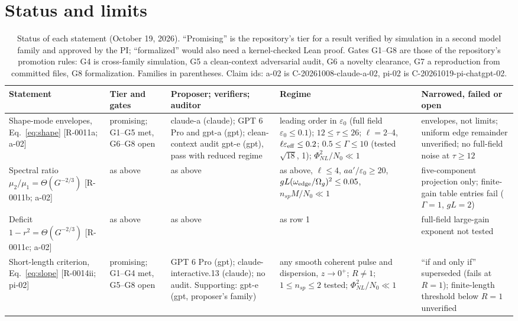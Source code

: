 \documentclass[aps,pra,twocolumn,superscriptaddress,nofootinbib,floatfix]{revtex4-2}
\newcommand{\PNL}{\Phi_{NL}}
\newcommand{\nsp}{n_{sp}}
\newcommand{\eps}{\varepsilon_0}
\begin{document}
\section{Status and limits}\label{sec:status}

\begin{table}[t]
\caption{Status of each statement (October 19, 2026). ``Promising'' is the repository's tier for a result verified by
simulation in a second model family and approved by the PI; ``formalized'' would also need a kernel-checked Lean proof.
Gates G1--G8 are those of the repository's promotion rules: G4 is cross-family simulation, G5 a clean-context adversarial
audit, G6 a novelty clearance, G7 a reproduction from committed files, G8 formalization. Families in parentheses. Claim
ids: a-02 is C-20261008-claude-a-02, pi-02 is C-20261019-pi-chatgpt-02.}
\label{tab:status}
\begin{ruledtabular}\footnotesize
\begin{tabular}{p{3.3cm}p{2.5cm}p{3.9cm}p{4.0cm}p{3.6cm}}
\raggedright Statement & \raggedright Tier and gates & \raggedright Proposer; verifiers; auditor & \raggedright Regime & \raggedright Narrowed, failed or open \tabularnewline \hline
\raggedright Shape-mode envelopes, Eq.~\eqref{eq:shape} [R-0011a; a-02] & \raggedright promising; G1--G5 met, G6--G8 open & \raggedright claude-a (claude); GPT 6 Pro and gpt-a (gpt); clean-context audit gpt-e (gpt), pass with reduced regime & \raggedright leading order in $\eps$ (full field $\eps\le0.1$); $12\le\tau\le26$; $\ell=2$--4, $\ell\varepsilon_{\rm eff}\le0.2$; $0.5\le\Gamma\le10$ (tested $\sqrt{18}$, 1); $\PNL^2/N_0\ll1$ & \raggedright envelopes, not limits; uniform edge remainder unverified; no full-field noise at $\tau\ge12$ \tabularnewline
\raggedright Spectral ratio $\mu_2/\mu_1=\Theta(G^{-2/3})$ [R-0011b; a-02] & \raggedright as above & \raggedright as above & \raggedright as above, $\ell\le4$, $aa'/\eps\ge20$, $gL(\omega_{\rm edge}/\Omega_g)^2\le0.05$, $\nsp M/N_0\ll1$ & \raggedright five-component projection only; finite-gain table entries fail ($\Gamma=1$, $gL=2$) \tabularnewline
\raggedright Deficit $1-r^2=\Theta(G^{-2/3})$ [R-0011c; a-02] & \raggedright as above & \raggedright as above & \raggedright as row 1 & \raggedright full-field large-gain exponent not tested \tabularnewline
\raggedright Short-length criterion, Eq.~\eqref{eq:slope} [R-0014ii; pi-02] & \raggedright promising; G1--G4 met, G5--G8 open & \raggedright GPT 6 Pro (gpt); claude-interactive.13 (claude); no audit. Supporting: gpt-e (gpt, proposer's family) & \raggedright any smooth coherent pulse and dispersion, $z\to0^+$; $R\ne1$; $1\le\nsp\le2$ tested; $\PNL^2/N_0\ll1$ & \raggedright ``if and only if'' superseded (fails at $R=1$); finite-length threshold below $R=1$ unverified \tabularnewline

\end{tabular}
\end{ruledtabular}
\end{table}
\end{document}
